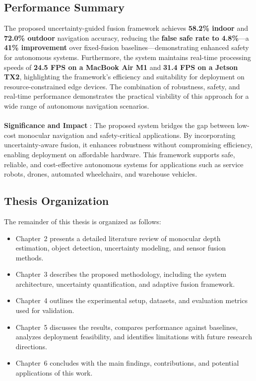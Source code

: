 \documentclass[12pt,oneside]{book}
\begin{document}
\begin{samepage}

\subsection{Performance Summary}
The proposed uncertainty-guided fusion framework achieves \textbf{58.2\% indoor} and \textbf{72.0\% outdoor} navigation accuracy, reducing the \textbf{false safe rate to 4.8\%}—a \textbf{41\% improvement} over fixed-fusion baselines—demonstrating enhanced safety for autonomous systems.
Furthermore, the system maintains real-time processing speeds of \textbf{24.5 FPS on a MacBook Air M1} and \textbf{31.4 FPS on a Jetson TX2}, highlighting the framework’s efficiency and suitability for deployment on resource-constrained edge devices. The combination of robustness, safety, and real-time performance demonstrates the practical viability of this approach for a wide range of autonomous navigation scenarios. \\ \\
\textbf{Significance and Impact}
: The proposed system bridges the gap between low-cost monocular navigation and safety-critical applications. By incorporating uncertainty-aware fusion, it enhances robustness without compromising efficiency, enabling deployment on affordable hardware. This framework supports safe, reliable, and cost-effective autonomous systems for applications such as service robots, drones, automated wheelchairs, and warehouse vehicles.
\subsection{Thesis Organization}
The remainder of this thesis is organized as follows:
\begin{itemize}
    \item Chapter~2 presents a detailed literature review of monocular depth estimation, object detection, uncertainty modeling, and sensor fusion methods.
    \item Chapter~3 describes the proposed methodology, including the system architecture, uncertainty quantification, and adaptive fusion framework.
    \item Chapter~4 outlines the experimental setup, datasets, and evaluation metrics used for validation.
    \item Chapter~5 discusses the results, compares performance against baselines, analyzes deployment feasibility, and identifies limitations with future research directions.
    \item Chapter~6 concludes with the main findings, contributions, and potential applications of this work.
\end{itemize}

\end{samepage}
\end{document}
